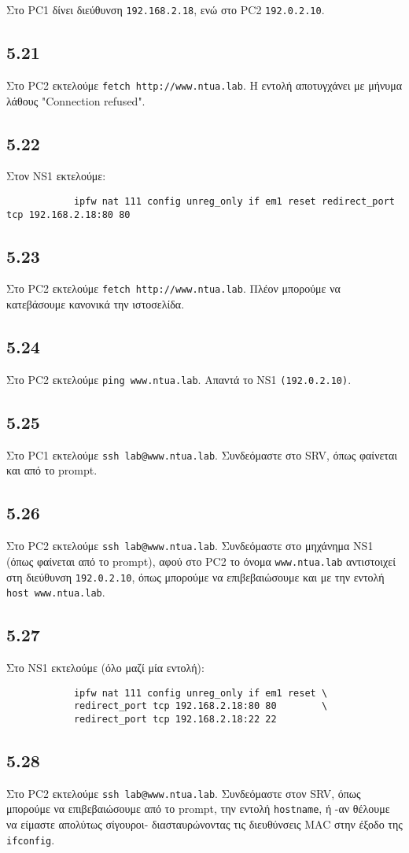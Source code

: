 \documentclass[a4paper, 12pt]{article}
\begin{document}
		Στο PC1 δίνει διεύθυνση \verb|192.168.2.18|, ενώ στο PC2 \verb|192.0.2.10|.

	\subsection*{5.21}
		Στο PC2 εκτελούμε \verb|fetch http://www.ntua.lab|. Η εντολή αποτυγχάνει με μήνυμα λάθους "Connection refused".
	
	\subsection*{5.22}
		Στον NS1 εκτελούμε:
		
		\begin{verbatim}
			ipfw nat 111 config unreg_only if em1 reset redirect_port tcp 192.168.2.18:80 80
		\end{verbatim}

	\subsection*{5.23}
		Στο PC2 εκτελούμε \verb|fetch http://www.ntua.lab|. Πλέον μπορούμε να κατεβάσουμε κανονικά την ιστοσελίδα.

	\subsection*{5.24}
		Στο PC2 εκτελούμε \verb|ping www.ntua.lab|. Απαντά το NS1 \verb|(192.0.2.10)|.

	\subsection*{5.25}
		Στο PC1 εκτελούμε \verb|ssh lab@www.ntua.lab|. Συνδεόμαστε στο SRV, όπως φαίνεται και από το prompt.

	\subsection*{5.26}
		Στο PC2 εκτελούμε \verb|ssh lab@www.ntua.lab|. Συνδεόμαστε στο μηχάνημα NS1 (όπως φαίνεται από το prompt), αφού στο PC2 το όνομα \verb|www.ntua.lab| αντιστοιχεί στη διεύθυνση \verb|192.0.2.10|, όπως μπορούμε να επιβεβαιώσουμε και με την εντολή \verb|host www.ntua.lab|.

	\subsection*{5.27}
		Στο NS1 εκτελούμε (όλο μαζί μία εντολή):
		
		\begin{verbatim}
			ipfw nat 111 config unreg_only if em1 reset \
			redirect_port tcp 192.168.2.18:80 80        \
			redirect_port tcp 192.168.2.18:22 22
		\end{verbatim}

	\subsection*{5.28}
		Στο PC2 εκτελούμε \verb|ssh lab@www.ntua.lab|. Συνδεόμαστε στον SRV, όπως μπορούμε να επιβεβαιώσουμε από το prompt, την εντολή \verb|hostname|, ή -αν θέλουμε να είμαστε απολύτως σίγουροι- διασταυρώνοντας τις διευθύνσεις MAC στην έξοδο της \verb|ifconfig|.
	
\end{document}
